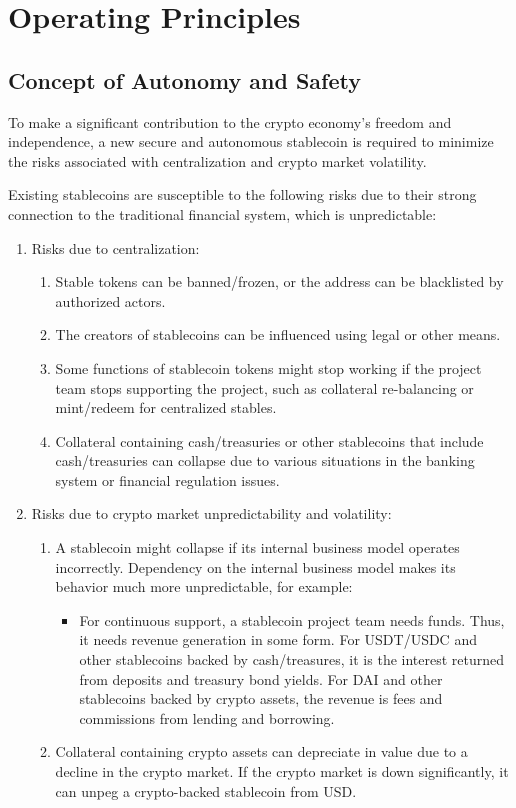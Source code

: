 \section{Operating Principles}

\subsection{Concept of Autonomy and Safety}

To make a significant contribution to the crypto economy's freedom 
and independence, a new secure and autonomous stablecoin is required 
to minimize the risks associated with centralization and crypto 
market volatility.

Existing stablecoins are susceptible to the following risks due to their 
strong connection to the traditional financial system, which is unpredictable:

\begin{enumerate}
\item Risks due to centralization:
	\begin{enumerate}
		\item Stable tokens can be banned/frozen, or the address can be blacklisted by authorized actors.
    \item The creators of stablecoins can be influenced using legal or other means.
    \item Some functions of stablecoin tokens might stop working if the project
    team stops supporting the project, such as collateral re-balancing or 
    mint/redeem for centralized stables.
    \item Collateral containing cash/treasuries or other stablecoins that include 
    cash/treasuries can collapse due to various situations in the banking system 
    or financial regulation issues.
  \end{enumerate}
\item Risks due to crypto market unpredictability and volatility:
	\begin{enumerate}
    \item A stablecoin might collapse if its internal business model operates incorrectly. 
    Dependency on the internal business model makes its behavior much more unpredictable, for example:
    \begin{itemize}
      \item For continuous support, a stablecoin project team needs funds. Thus, it needs 
      revenue generation in some form. For USDT/USDC and other stablecoins backed 
      by cash/treasures, it is the interest returned from deposits and treasury bond yields. 
      For DAI and other stablecoins backed by crypto assets, the revenue is fees and commissions 
      from lending and borrowing.
    \end{itemize}
    \item Collateral containing crypto assets can depreciate in value due to a decline 
    in the crypto market. If the crypto market is down significantly, it can unpeg 
    a crypto-backed stablecoin from USD.
  \end{enumerate}
\end{enumerate}



